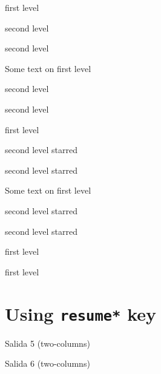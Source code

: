 \documentclass{article}
\begin{document}
\begin{enumext}[columns=2]
  \item first level
    \begin{enumext}[series=foo]
      \item second level
      \item second level
    \end{enumext}
    Some text on first level
    \begin{enumext}[resume=foo]
      \item second level
      \item second level
    \end{enumext}
  \item first level
    \begin{enumext*}[series=baz]
      \item second level starred
      \item second level starred
    \end{enumext*}
    Some text on first level
    \begin{enumext*}[resume=baz]
      \item second level starred
      \item second level starred
    \end{enumext*}
  \item first level
  \item first level
\end{enumext}

\section*{Using \texttt{resume*} key}

\begin{enumext}[resume*]
  \item Salida 5 (two-columns)
  \item Salida 6 (two-columns)
\end{enumext}
\end{document}
